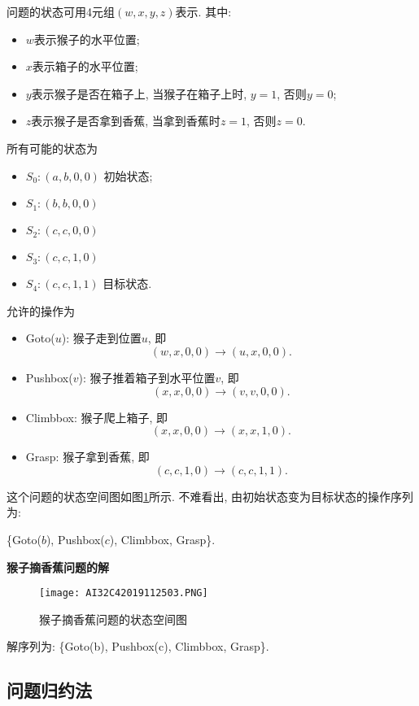 \begin{result}
问题的状态可用4元组$(w, x, y, z)$表示. 其中:
\begin{itemize}
\item $w$表示猴子的水平位置;
\item $x$表示箱子的水平位置;
\item $y$表示猴子是否在箱子上, 当猴子在箱子上时, $y=1$, 否则$y=0$;
\item $z$表示猴子是否拿到香蕉, 当拿到香蕉时$z=1$, 否则$z=0$.
\end{itemize}
所有可能的状态为
\begin{itemize}
\item $S_0: (a, b, 0, 0)$    初始状态;
\item $S_1: (b, b, 0, 0)$
\item $S_2: (c, c, 0, 0)$
\item $S_3: (c, c, 1, 0)$
\item $S_4: (c, c, 1, 1)$    目标状态.
\end{itemize}
允许的操作为
\begin{itemize}
\item Goto($u$): 猴子走到位置$u$, 即
         $$(w, x, 0, 0) \rightarrow (u, x, 0, 0).$$
\item Pushbox($v$): 猴子推着箱子到水平位置$v$, 即
         $$(x, x, 0, 0) \rightarrow (v, v, 0, 0).$$
\item Climbbox: 猴子爬上箱子, 即
         $$(x, x, 0, 0) \rightarrow (x, x, 1, 0).$$
\item Grasp: 猴子拿到香蕉, 即
         $$(c, c, 1, 0 ) \rightarrow (c, c, 1, 1).$$
\end{itemize}
这个问题的状态空间图如图\ref{AI32fig2019120224}所示. 不难看出, 由初始状态变为目标状态的操作序列为:
\begin{center}
  \{Goto($b$), Pushbox($c$), Climbbox, Grasp\}.
\end{center}
\textbf{猴子摘香蕉问题的解}
\begin{figure}[H]
\centering
\texttt{[image: AI32C42019112503.PNG]}
\caption{猴子摘香蕉问题的状态空间图}
\label{AI32fig2019120224}
\end{figure}
解序列为: \{Goto(b), Pushbox(c), Climbbox, Grasp\}.
\end{result}
\subsection{问题归约法}
